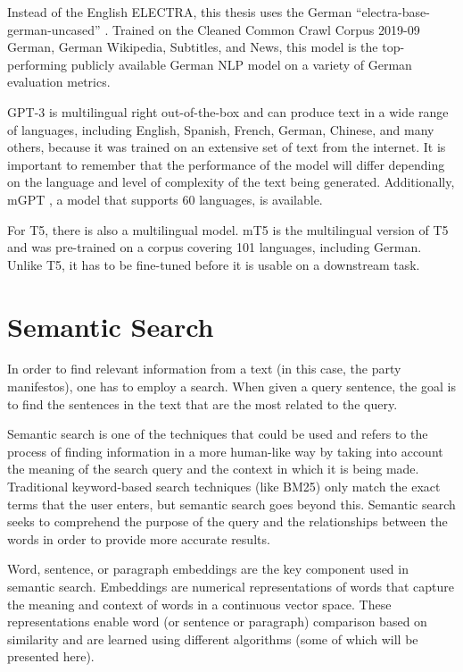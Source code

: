Instead of the English ELECTRA, this thesis uses the German ``electra-base-german-uncased'' \citep{german_electra}. Trained on the Cleaned Common Crawl Corpus 2019-09 German, German Wikipedia, Subtitles, and News, this model is the top-performing publicly available German NLP model on a variety of German evaluation metrics.

GPT-3 is multilingual right out-of-the-box and can produce text in a wide range of languages, including English, Spanish, French, German, Chinese, and many others, because it was trained on an extensive set of text from the internet. It is important to remember that the performance of the model will differ depending on the language and level of complexity of the text being generated. Additionally, mGPT \citep{shliazhko2022mgpt}, a model that supports 60 languages, is available.

For T5, there is also a multilingual model. mT5 \citep{xue2020mt5} is the multilingual version of T5 and was pre-trained on a corpus covering 101 languages, including German. Unlike T5, it has to be fine-tuned before it is usable on a downstream task.


\section{Semantic Search}\label{semantic_search}

In order to find relevant information from a text (in this case, the party manifestos), one has to employ a search. When given a query sentence, the goal is to find the sentences in the text that are the most related to the query.

Semantic search is one of the techniques that could be used and refers to the process of finding information in a more human-like way by taking into account the meaning of the search query and the context in which it is being made. Traditional keyword-based search techniques (like BM25) only match the exact terms that the user enters, but semantic search goes beyond this. Semantic search seeks to comprehend the purpose of the query and the relationships between the words in order to provide more accurate results.

Word, sentence, or paragraph embeddings are the key component used in semantic search. Embeddings are numerical representations of words that capture the meaning and context of words in a continuous vector space. These representations enable word (or sentence or paragraph) comparison based on similarity and are learned using different algorithms (some of which will be presented here).


